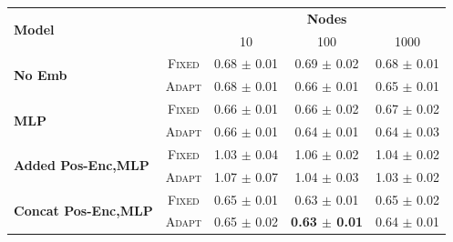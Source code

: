 \documentclass[aspectratio=169]{beamer}
\begin{document}
\begin{frame}
    \centering
    \begin{tabular}{lcccc} \toprule
        \multirow{2}{*}{\textbf{Model}}              &                            & \multicolumn{3}{c}{\textbf{Nodes}}                                                          \\ \cmidrule(lr){3-5}
                                                     &                            & 10                                 & 100                            & 1000                  \\ \hline
        \multirow{2}{*}{\textbf{No Emb}}             & \scriptsize \textsc{Fixed} & 0.68 \tiny $\pm$ 0.01              & 0.69 \tiny $\pm$ 0.02          & 0.68 \tiny $\pm$ 0.01 \\
                                                     & \scriptsize \textsc{Adapt} & 0.68 \tiny $\pm$ 0.01              & 0.66 \tiny $\pm$ 0.01          & 0.65 \tiny $\pm$ 0.01 \\
        \multirow{2}{*}{\textbf{MLP}}                & \scriptsize \textsc{Fixed} & 0.66 \tiny $\pm$ 0.01              & 0.66 \tiny $\pm$ 0.02          & 0.67 \tiny $\pm$ 0.02 \\
                                                     & \scriptsize \textsc{Adapt} & 0.66 \tiny $\pm$ 0.01              & 0.64 \tiny $\pm$ 0.01          & 0.64 \tiny $\pm$ 0.03 \\
        \multirow{2}{*}{\textbf{Added Pos-Enc,MLP}}  & \scriptsize \textsc{Fixed} & 1.03 \tiny $\pm$ 0.04              & 1.06 \tiny $\pm$ 0.02          & 1.04 \tiny $\pm$ 0.02 \\
                                                     & \scriptsize \textsc{Adapt} & 1.07 \tiny $\pm$ 0.07              & 1.04 \tiny $\pm$ 0.03          & 1.03 \tiny $\pm$ 0.02 \\
        \multirow{2}{*}{\textbf{Concat Pos-Enc,MLP}} & \scriptsize \textsc{Fixed} & 0.65 \tiny $\pm$ 0.01              & 0.63 \tiny $\pm$ 0.01          & 0.65 \tiny $\pm$ 0.02 \\
                                                     & \scriptsize \textsc{Adapt} & 0.65 \tiny $\pm$ 0.02              & \textbf{0.63 \tiny $\pm$ 0.01} & 0.64 \tiny $\pm$ 0.01 \\
        \bottomrule
    \end{tabular}
\end{frame}
\end{document}
